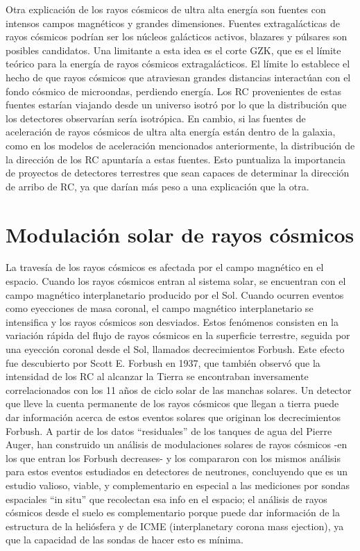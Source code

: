 \documentclass{book}
\begin{document}
Otra explicaci\'on de los rayos c\'osmicos de ultra alta energ\'ia son fuentes con intensos campos magn\'eticos y grandes dimensiones. Fuentes extragal\'acticas de rayos c\'osmicos podr\'ian ser los n\'ucleos gal\'acticos activos, blazares y p\'ulsares son posibles candidatos. Una limitante a esta idea es el corte GZK, que es el l\'imite te\'orico para la energ\'ia de rayos c\'osmicos extragal\'acticos. El l\'imite lo establece el hecho de que rayos c\'osmicos que atraviesan grandes distancias interact\'uan con el fondo c\'osmico de microondas, perdiendo energ\'ia. Los RC provenientes de estas fuentes estar\'ian viajando desde un universo isotr\'o por lo que la distribuci\'on que los detectores observar\'ian ser\'ia isotr\'opica. En cambio, si las fuentes de aceleraci\'on de rayos c\'osmicos de ultra alta energ\'ia est\'an dentro de la galaxia, como en los modelos de aceleraci\'on mencionados anteriormente, la distribuci\'on de la direcci\'on de los RC apuntar\'ia a estas fuentes. Esto puntualiza la importancia de proyectos de detectores terrestres que sean capaces de determinar la direcci\'on de arribo de RC, ya que dar\'ian m\'as peso a una explicaci\'on que la otra. \citep{PEREZ}

\section{Modulaci\'on solar de rayos c\'osmicos}

La traves\'ia de los rayos c\'osmicos es afectada por el campo magn\'etico en el espacio. Cuando los rayos c\'osmicos entran al sistema solar, se encuentran con el campo magn\'etico interplanetario producido por el Sol. Cuando ocurren eventos como eyecciones de masa coronal, el campo magn\'etico interplanetario se intensifica y los rayos c\'osmicos son desviados. Estos fen\'omenos consisten en la variaci\'on r\'apida del flujo de rayos c\'osmicos en la superficie terrestre, seguida por una eyecci\'on coronal desde el Sol, llamados decrecimientos Forbush. Este efecto fue descubierto por Scott E. Forbush en 1937, que tambi\'en observ\'o que la intensidad de los RC al alcanzar la Tierra se encontraban inversamente correlacionados con los 11 a\~nos de ciclo solar de las manchas solares. Un detector que lleve la cuenta permanente de los rayos c\'osmicos que llegan a tierra puede dar informaci\'on acerca de estos eventos solares que originan los decrecimientos Forbush. A partir de los datos “residuales” de los tanques de agua del Pierre Auger, han construido un an\'alisis de modulaciones solares de rayos c\'osmicos -en los que entran los Forbush decreases- y los compararon con los mismos an\'alisis para estos eventos estudiados en detectores de neutrones, concluyendo que es un estudio valioso, viable, y complementario en especial a las mediciones por sondas espaciales “in situ” que recolectan esa info en el espacio; el an\'alisis de rayos c\'osmicos desde el suelo es complementario porque puede dar informaci\'on de la estructura de la heli\'osfera y de ICME (interplanetary corona mass ejection), ya que la capacidad de las sondas de hacer esto es m\'inima. \citep{VILLASENOR}
\end{document}
